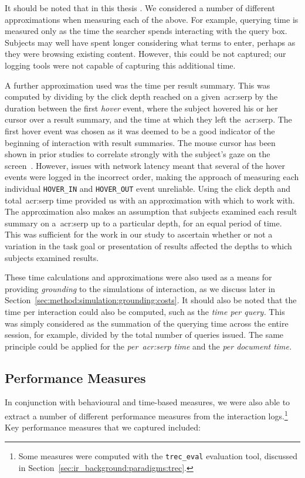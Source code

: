 It should be noted that in this thesis . We considered a number of different approximations when measuring each of the above. For example, querying time is measured only as the time the searcher spends interacting with the query box. Subjects may well have spent longer considering what terms to enter, perhaps as they were browsing existing content. However, this could be not captured; our logging tools were not capable of capturing this additional time.

A further approximation used was the time per result summary. This was computed by dividing by the click depth reached on a given~\gls{acr:serp} by the duration between the first \emph{hover} event, where the subject hovered his or her cursor over a result summary, and the time at which they left the~\gls{acr:serp}. The first hover event was chosen as it was deemed to be a good indicator of the beginning of interaction with result summaries. The mouse cursor has been shown in prior studies to correlate strongly with the subject's gaze on the screen~\citep{chen2001mouse_cursor, smucker2014judging_relevance_movements}. However, issues with network latency meant that several of the hover events were logged in the incorrect order, making the approach of measuring each individual \texttt{HOVER\_IN} and \texttt{HOVER\_OUT} event unreliable. Using the click depth and total~\gls{acr:serp} time provided us with an approximation with which to work with. The approximation also makes an assumption that subjects examined each result summary on a~\gls{acr:serp} up to a particular depth, for an equal period of time. This was sufficient for the work in our study to ascertain whether or not a variation in the task goal or presentation of results affected the depths to which subjects examined results.

These time calculations and approximations were also used as a means for providing \emph{grounding} to the simulations of interaction, as we discuss later in Section~\ref{sec:method:simulation:grounding:costs}. It should also be noted that the time per interaction could also be computed, such as the \emph{time per query.} This was simply considered as the summation of the querying time across the entire session, for example, divided by the total number of queries issued. The same principle could be applied for the \emph{per~\gls{acr:serp} time} and the \emph{per document time.}

\subsection{Performance Measures}\label{sec:methodology:extracting:performance}
In conjunction with behavioural and time-based measures, we were also able to extract a number of different performance measures from the interaction logs.\footnote{Some measures were computed with the \texttt{trec\_eval} evaluation tool, discussed in Section~\ref{sec:ir_background:paradigms:trec}.} Key performance measures that we captured included:


